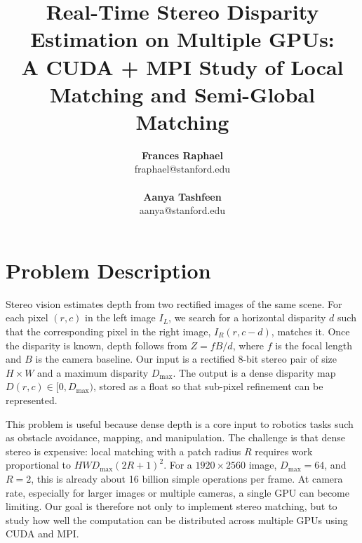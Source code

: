 \documentclass[11pt]{article}
\begin{document}
\title{Real-Time Stereo Disparity Estimation on Multiple GPUs:\\
A CUDA + MPI Study of Local Matching and Semi-Global Matching}

\author{%
\begin{center}
\begin{minipage}[t]{0.46\textwidth}\centering
\textbf{Frances Raphael}\\
{\ttfamily fraphael@stanford.edu}\\
\end{minipage}\hfill
\begin{minipage}[t]{0.46\textwidth}\centering
\textbf{Aanya Tashfeen}\\
{\ttfamily aanya@stanford.edu}\\
\end{minipage}
\end{center}
}
\maketitle

\section{Problem Description}

Stereo vision estimates depth from two rectified images of the same scene. For each pixel $(r,c)$ in the left image $I_L$, we search for a horizontal disparity $d$ such that the corresponding pixel in the right image, $I_R(r,c-d)$, matches it. Once the disparity is known, depth follows from $Z=fB/d$, where $f$ is the focal length and $B$ is the camera baseline. Our input is a rectified 8-bit stereo pair of size $H\times W$ and a maximum disparity $D_{\max}$. The output is a dense disparity map $D(r,c)\in[0,D_{\max})$, stored as a float so that sub-pixel refinement can be represented.

This problem is useful because dense depth is a core input to robotics tasks such as obstacle avoidance, mapping, and manipulation. The challenge is that dense stereo is expensive: local matching with a patch radius $R$ requires work proportional to $HWD_{\max}(2R+1)^2$. For a $1920\times2560$ image, $D_{\max}=64$, and $R=2$, this is already about 16 billion simple operations per frame. At camera rate, especially for larger images or multiple cameras, a single GPU can become limiting. Our goal is therefore not only to implement stereo matching, but to study how well the computation can be distributed across multiple GPUs using CUDA and MPI.
\end{document}
